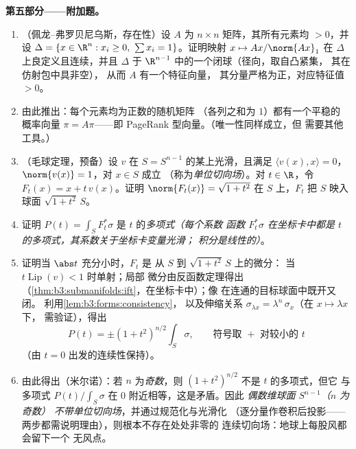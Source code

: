 \begin{problem}
\medskip
\noindent\textbf{第五部分——附加题。}
\begin{enumerate}[resume]
  \item （佩龙–弗罗贝尼乌斯，存在性）设 $A$ 为
        $n\times n$ 矩阵，其所有元素均 $> 0$，并设
        $\Delta = \{x \in \R^n : x_i \geq 0,\ \sum x_i =
        1\}$。证明映射 $x \mapsto Ax/\norm{Ax}_1$
        在 $\Delta$ 上良定义且连续，并且
        $\Delta$ 于
        $\R^{n-1}$ 中的一个闭球（径向，取自凸紧集，
        其在仿射包中具非空），
        从而 $A$ 有一个特征向量，
        其分量严格为正，对应特征值 $> 0$。
  \item 由此推出：每个元素均为正数的随机矩阵
        （各列之和为 $1$）都有一个平稳的
        概率向量 $\pi = A\pi$——即
        PageRank 型向量。（唯一性同样成立，但
        需要其他工具。）
  \item （毛球定理，预备）设 $v$ 在
        $S = S^{n-1}$ 的某上光滑，且满足 $\langle v(x),
        x\rangle = 0$，$\norm{v(x)} = 1$，对 $x \in S$ 成立
        （称为\emph{单位切向场}）。对 $t \in \R$，令
        $F_t(x) = x + t\,v(x)$。证明
        $\norm{F_t(x)} = \sqrt{1 + t^2}$ 在 $S$ 上，$F_t$ 把
        $S$ 映入球面 $\sqrt{1+t^2}\,S$。
  \item 证明 $P(t) = \int_SF_t^*\sigma$ 是
        $t$ 的\emph{多项式}\emph{（每个系数
        函数 $F_t^*\sigma$ 在坐标卡中都是
        $t$ 的多项式，其系数关于坐标卡变量光滑；
        积分是线性的）}。
  \item 证明当 $\abs t$ 充分小时，$F_t$ 是
        从 $S$ 到 $\sqrt{1+t^2}\,S$ 上的微分：
        当 $t\operatorname{Lip}(v) < 1$ 时单射；局部
        微分由反函数定理得出
        （\cref{thm:b3:submanifolds:ift}，在坐标卡中）；像
        在连通的目标球面中既开又闭。
        利用\cref{lem:b3:forms:consistency}，
        以及伸缩关系 $\sigma_{\lambda x} =
        \lambda^{n}\,\sigma_x$（在 $x \mapsto \lambda x$ 下，
        需验证），得出
        \[
        P(t) = \pm(1 + t^2)^{n/2}\int_S\sigma,
        \qquad\text{符号取 } + \text{ 对较小的 } t
        \]
        （由 $t = 0$ 出发的连续性保持）。
  \item 由此得出（米尔诺）：若 $n$ 为\emph{奇数}，则 $(1 +
        t^2)^{n/2}$ 不是 $t$ 的多项式，但它
        与多项式 $P(t)/\int_S\sigma$ 在
        $0$ 附近相等，这是矛盾。因此\emph{
        偶数维球面 $S^{n-1}$（$n$ 为奇数）
        不带单位切向场}，并通过规范化与光滑化
        （逐分量作卷积后投影——
        两步都需说明理由），则根本不存在处处非零的
        连续切向场：地球上每股风都会留下一个
        无风点。


\end{enumerate}
\end{problem}
